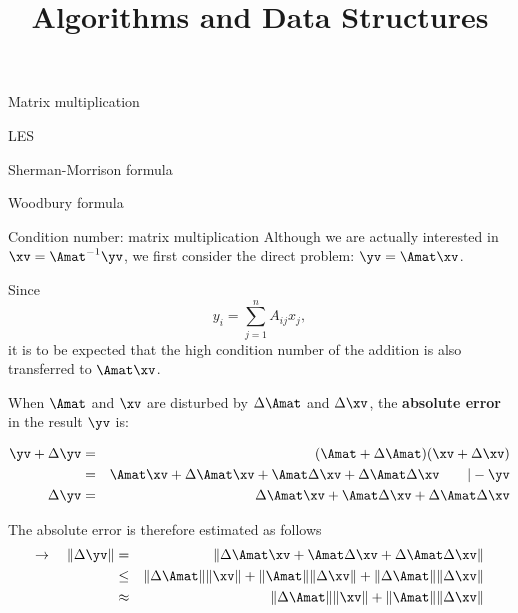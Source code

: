 \documentclass[11pt,compress,t,notes=noshow, xcolor=table]{beamer}
\title{Algorithms and Data Structures}
\begin{document}
{
  \item Matrix multiplication
  \item LES
  \item Sherman-Morrison formula
  \item Woodbury formula
}


\begin{vbframe}{Condition number: matrix multiplication}
Although we are actually interested in $\xv = \Amat^{-1}\yv$, we first consider the direct problem: $\yv = \Amat \xv$.

\lz

Since
$$
y_i = \sum_{j = 1}^n A_{ij}x_j,
$$
it is to be expected that the high condition number of the addition is also transferred to $\Amat \xv$.

\framebreak

When $\Amat$ and $\xv$ are disturbed by $\Delta \Amat$ and $\Delta \xv$, the \textbf{absolute error} in the result $\yv$ is:

\begin{eqnarray*}
\yv + \Delta \yv &=& (\Amat + \Delta \Amat)(
  \xv + \Delta \xv)\\  &=& \Amat \xv + \Delta \Amat\xv + \Amat\Delta \xv +
      \Delta \Amat\Delta \xv \qquad | - \yv \\
\Delta \yv &=& \Delta \Amat\xv + \Amat\Delta \xv +
      \Delta \Amat\Delta \xv
\end{eqnarray*}

The absolute error is therefore estimated as follows
\begin{eqnarray*}
\to \quad \|\Delta \yv\| &=& \|\Delta \Amat\xv + \Amat\Delta \xv +
      \Delta \Amat\Delta \xv\| \\ &\le& \|\Delta \Amat\|\|\xv\| + \|\Amat\|\|\Delta \xv\| +
      \|\Delta \Amat\|\|\Delta \xv\| \\
      &\approx& \|\Delta \Amat\|\|\xv\| + \|\Amat\|\|\Delta \xv\|
\end{eqnarray*}

%


\end{vbframe}
\end{document}
